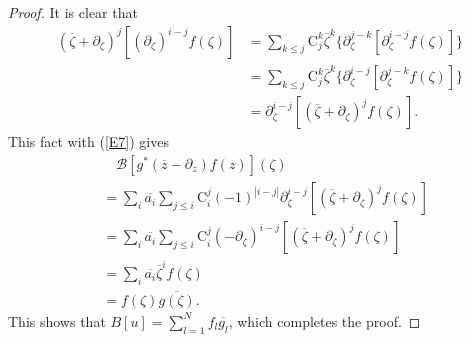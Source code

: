 \documentclass[11pt,reqno]{amsart}
\theoremstyle{definition}
\begin{document}
\begin{proof}
It is clear that
\begin{align*}
(\overline{\zeta}+\partial_\zeta)^j[(\partial_\zeta)^{i-j}f(\zeta)]&=\sum_{k\leq j} \mathrm{C}_j^k\overline{\zeta}^k \bigg\{\partial_{\zeta}^{j-k}[\partial_\zeta^{i-j}f(\zeta)]\bigg\}
\\&=\sum_{k\leq j} \mathrm{C}_j^k\overline{\zeta}^k \bigg\{\partial_{\zeta}^{i-j} [\partial_\zeta^{j-k}f(\zeta)]\bigg\}\\
&=\partial_\zeta^{i-j}[(\overline{\zeta}+\partial_\zeta)^jf(\zeta)].
\end{align*}
This fact with (\ref{E7}) gives
\begin{align*}
&\quad\mathcal{B}[g^*(\overline{z}-\partial_z)f(z)](\zeta)\\
&=\sum_i \overline{a_i}   \sum_{j\leq i} \mathrm{C}_{i}^j (-1)^{|i-j|}\partial_\zeta^{i-j}[(\overline{\zeta}+\partial_\zeta)^jf(\zeta)] \\ %
&=\sum_i \overline{a_i}   \sum_{j\leq i} \mathrm{C}_{i}^j(-\partial_\zeta)^{i-j}[(\overline{\zeta}+\partial_\zeta)^jf(\zeta)] \\
&=\sum_i \overline{a_i} \overline{\zeta}^i f(\zeta)\\
&=f(\zeta) \overline{g(\zeta)}.
\end{align*}
This shows that $B[u]=\sum_{l=1}^N f_l\overline{g_l}$,
which completes the proof.
\end{proof}
\end{document}
